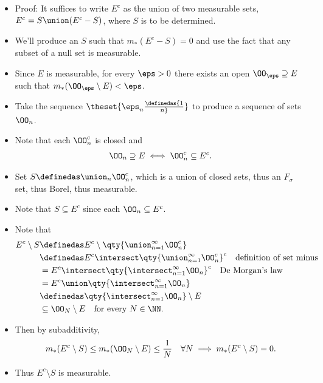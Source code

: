 \begin{solution}
\begin{itemize}
  \begin{itemize}
  \tightlist
  \item
    Proof: It suffices to write \(E^c\) as the union of two measurable
    sets, \(E^c = S \union (E^c - S)\), where \(S\) is to be determined.
  \item
    We'll produce an \(S\) such that \(m_*(E^c - S) = 0\) and use the
    fact that any subset of a null set is measurable.
  \item
    Since \(E\) is measurable, for every \(\eps > 0\) there exists an
    open \(\OO_\eps \supseteq E\) such that
    \(m_*(\OO_\eps \setminus E) < \eps\).
  \item
    Take the sequence \(\theset{\eps_n \definedas {1\over n}}\) to
    produce a sequence of sets \(\OO_n\).
  \item
    Note that each \(\OO_n^c\) is closed and
    \begin{align*}
    \OO_n \supseteq E \iff \OO_n^c \subseteq E^c
    .\end{align*}
  \item
    Set \(S \definedas \union_n \OO_n^c\), which is a union of closed
    sets, thus an \(F_\sigma\) set, thus Borel, thus measurable.
  \item
    Note that \(S\subseteq E^c\) since each \(\OO_n \subseteq E^c\).
  \item
    Note that
    \begin{align*}
    E^c\setminus S 
    &\definedas E^c \setminus \qty{\union_{n=1}^\infty \OO_n^c} \\
    &\definedas E^c \intersect \qty{\union_{n=1}^\infty \OO_n^c}^c  \quad\text{definition of set minus} \\ 
    &= E^c \intersect \qty{\intersect_{n=1}^\infty \OO_n}^c  \quad \text{De Morgan's law}\\
    &= E^c \union \qty{\intersect_{n=1}^\infty \OO_n}  \\
    &\definedas \qty{ \intersect_{n=1}^\infty \OO_n} \setminus E \\
    & \subseteq \OO_N \setminus E \quad \text{for every } N\in \NN
    .\end{align*}
  \item
    Then by subadditivity,
    \begin{align*}
    m_*(E^c\setminus S) \leq m_*(\OO_N \setminus E) \leq {1\over N} \quad \forall N \implies m_*(E^c\setminus S) = 0
    .\end{align*}
  \item
    Thus \(E^c\setminus S\) is measurable.
  \end{itemize}
\end{itemize}


\end{solution}
